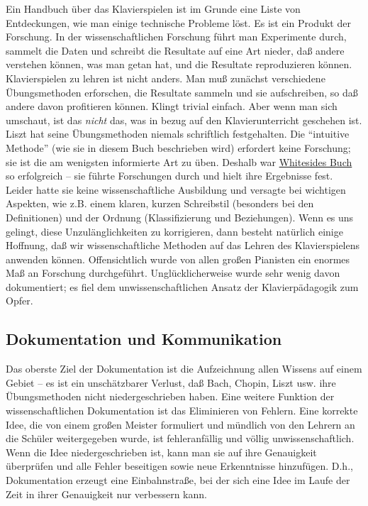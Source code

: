 Ein Handbuch über das Klavierspielen ist im Grunde eine Liste von Entdeckungen, wie man einige technische Probleme löst.
Es ist ein Produkt der Forschung.
In der wissenschaftlichen Forschung führt man Experimente durch, sammelt die Daten und schreibt die Resultate auf eine Art nieder, daß andere verstehen können, was man getan hat, und die Resultate reproduzieren können.
Klavierspielen zu lehren ist nicht anders.
Man muß zunächst verschiedene Übungsmethoden erforschen, die Resultate sammeln und sie aufschreiben, so daß andere davon profitieren können.
Klingt trivial einfach.
Aber wenn man sich umschaut, ist das \textit{nicht} das, was in bezug auf den Klavierunterricht geschehen ist.
Liszt hat seine Übungsmethoden niemals schriftlich festgehalten.
Die \enquote{intuitive Methode} (wie sie in diesem Buch beschrieben wird) erfordert keine Forschung; sie ist die am wenigsten informierte Art zu üben.
Deshalb war \hyperref[Whiteside]{Whitesides Buch} so erfolgreich -- sie führte Forschungen durch und hielt ihre Ergebnisse fest.
Leider hatte sie keine wissenschaftliche Ausbildung und versagte bei wichtigen Aspekten, wie z.B. einem klaren, kurzen Schreibstil (besonders bei den Definitionen) und der Ordnung (Klassifizierung und Beziehungen).
Wenn es uns gelingt, diese Unzulänglichkeiten zu korrigieren, dann besteht natürlich einige Hoffnung, daß wir wissenschaftliche Methoden auf das Lehren des Klavierspielens anwenden können.
Offensichtlich wurde von allen großen Pianisten ein enormes Maß an Forschung durchgeführt.
Unglücklicherweise wurde sehr wenig davon dokumentiert; es fiel dem unwissenschaftlichen Ansatz der Klavierpädagogik zum Opfer.


\subsection{Dokumentation und Kommunikation}
\label{c3_3d}

Das oberste Ziel der Dokumentation ist die Aufzeichnung allen Wissens auf einem Gebiet -- es ist ein unschätzbarer Verlust, daß Bach, Chopin, Liszt usw. ihre Übungsmethoden nicht niedergeschrieben haben.
Eine weitere Funktion der wissenschaftlichen Dokumentation ist das Eliminieren von Fehlern.
Eine korrekte Idee, die von einem großen Meister formuliert und mündlich von den Lehrern an die Schüler weitergegeben wurde, ist fehleranfällig und völlig unwissenschaftlich.
Wenn die Idee niedergeschrieben ist, kann man sie auf ihre Genauigkeit überprüfen und alle Fehler beseitigen sowie neue Erkenntnisse hinzufügen.
D.h., Dokumentation erzeugt eine Einbahnstraße, bei der sich eine Idee im Laufe der Zeit in ihrer Genauigkeit nur verbessern kann.

